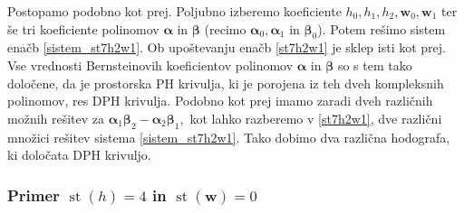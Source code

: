 \documentclass[12pt,a4paper,twoside]{article}
\theoremstyle{definition} %
\theoremstyle{plain} %
\theoremstyle{primerstyle}
\numberwithin{equation}{section}  %
\newcommand{\wV}{\mathbf{w}}
\newcommand{\balpha}{\boldsymbol \alpha}
\newcommand{\bbeta}{\boldsymbol \beta}
\DeclareMathOperator{\st}{st}
\begin{document}
Postopamo podobno kot prej. Poljubno izberemo koeficiente $h_0,h_1,h_2,\wV_0,\wV_1$ ter še tri koeficiente polinomov $\balpha$ in $\bbeta$ (recimo $\balpha_0,\balpha_1$ in $\bbeta_0$). Potem rešimo sistem enačb \eqref{sistem_st7h2w1}. Ob upoštevanju enačb \eqref{st7h2w1} je sklep isti kot prej. Vse vrednosti Bernsteinovih koeficientov polinomov $\balpha$ in $\bbeta$ so s tem tako določene, da je prostorska PH krivulja, ki je porojena iz teh dveh kompleksnih polinomov, res DPH krivulja. Podobno kot prej imamo zaradi dveh različnih možnih rešitev za $\balpha_1\bbeta_2-\balpha_2\bbeta_1,$ kot lahko razberemo v \eqref{st7h2w1}, dve različni množici rešitev sistema \eqref{sistem_st7h2w1}. Tako dobimo dva različna hodografa, ki določata DPH krivuljo.

\subsubsection{Primer \texorpdfstring{$\st(h)=4$}{st(h)=4} in \texorpdfstring{$\st(\wV)=0$}{st(w)=0}}
\label{klasifikacija_h4w0}
\end{document}

